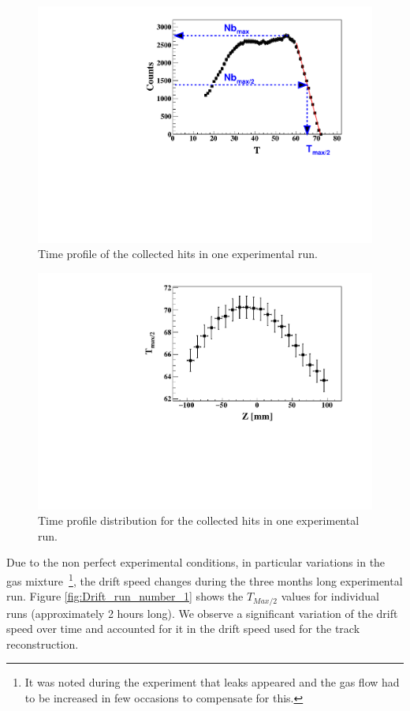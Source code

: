 \documentclass[twocolumn,showpacs,superscriptaddress,groupedaddress]{revtex4}
\begin{document}
\begin{figure}[tb]
   \centering
   \includegraphics[scale=0.42]{fig_2017/hits_time_profile.pdf}
   \caption[]{Time profile of the collected hits in one experimental run.  } 
   \label{fig:TDC_profile}
\end{figure}

\begin{figure}[tb]
\centering
\includegraphics[scale=0.42]{fig_2017/RunNumber_61452_TDCmax_Zslice.pdf}
\caption{Time profile distribution for the collected hits in one experimental 
run. } \label{fig:RunNumber_61551_TDCmax_Zslice}
\end{figure}

Due to the non perfect experimental conditions, in particular variations in the 
gas mixture~\footnote{It was noted during the experiment that leaks appeared
and the gas flow had to be increased in few occasions to compensate for this.}, 
the drift speed changes during the three months long experimental run.  
Figure \ref{fig:Drift_run_number_1} shows the $T_{Max/2}$ values for 
individual runs (approximately 2 hours long). We observe a significant 
variation of the drift speed over time and accounted for it in the drift 
speed used for the track reconstruction. 
\end{document}
